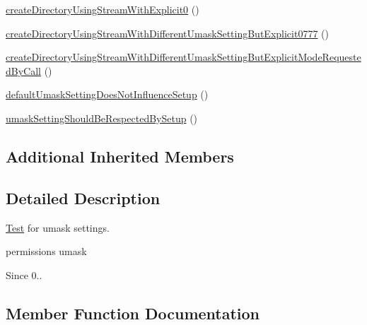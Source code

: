 \begin{DoxyCompactItemize}
\item 
\mbox{\hyperlink{classorg_1_1bovigo_1_1vfs_1_1vfs_stream_umask_test_case_afb20d38ae796ffe07b687f6d6246c7ac}{create\+Directory\+Using\+Stream\+With\+Explicit0}} ()
\item 
\mbox{\hyperlink{classorg_1_1bovigo_1_1vfs_1_1vfs_stream_umask_test_case_a5b9eec8ac43731ae53256ec98bd29385}{create\+Directory\+Using\+Stream\+With\+Different\+Umask\+Setting\+But\+Explicit0777}} ()
\item 
\mbox{\hyperlink{classorg_1_1bovigo_1_1vfs_1_1vfs_stream_umask_test_case_abc85bf74e45b499003f66f49bf4666ac}{create\+Directory\+Using\+Stream\+With\+Different\+Umask\+Setting\+But\+Explicit\+Mode\+Requested\+By\+Call}} ()
\item 
\mbox{\hyperlink{classorg_1_1bovigo_1_1vfs_1_1vfs_stream_umask_test_case_a3ca38dda621723408b11d25eae599b55}{default\+Umask\+Setting\+Does\+Not\+Influence\+Setup}} ()
\item 
\mbox{\hyperlink{classorg_1_1bovigo_1_1vfs_1_1vfs_stream_umask_test_case_aedd4000bce8a9dc643b50bf656602780}{umask\+Setting\+Should\+Be\+Respected\+By\+Setup}} ()
\end{DoxyCompactItemize}
\subsection*{Additional Inherited Members}


\subsection{Detailed Description}
\mbox{\hyperlink{class_test}{Test}} for umask settings.

permissions  umask \begin{DoxySince}{Since}
0.. 
\end{DoxySince}


\subsection{Member Function Documentation}
\mbox{\label{classorg_1_1bovigo_1_1vfs_1_1vfs_stream_umask_test_case_a01cbed801463354d7625953a3f5f3a26}} 
